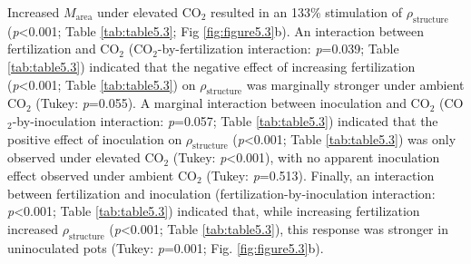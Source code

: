 Increased $M_\mathrm{area}$ under elevated CO$_2$ resulted in an 133\% stimulation of $\rho_\mathrm{structure}$ (\textit{p}<0.001; Table \ref{tab:table5.3}; Fig \ref{fig:figure5.3}b). An interaction between fertilization and CO$_2$ (CO$_2$-by-fertilization interaction: \textit{p}=0.039; Table \ref{tab:table5.3}) indicated that the negative effect of increasing fertilization (\textit{p}<0.001; Table \ref{tab:table5.3}) on $\rho_\mathrm{structure}$ was marginally stronger under ambient CO$_2$ (Tukey: \textit{p}=0.055). A marginal interaction between inoculation and CO$_2$ (CO$_2$-by-inoculation interaction: \textit{p}=0.057; Table \ref{tab:table5.3}) indicated that the positive effect of inoculation on $\rho_\mathrm{structure}$ (\textit{p}<0.001; Table \ref{tab:table5.3}) was only observed under elevated CO$_2$ (Tukey: \textit{p}<0.001), with no apparent inoculation effect observed under ambient CO$_2$ (Tukey: \textit{p}=0.513). Finally, an interaction between fertilization and inoculation (fertilization-by-inoculation interaction: \textit{p}<0.001; Table \ref{tab:table5.3}) indicated that, while increasing fertilization increased $\rho_\mathrm{structure}$ (\textit{p}<0.001; Table \ref{tab:table5.3}), this response was stronger in uninoculated pots (Tukey: \textit{p}=0.001; Fig. \ref{fig:figure5.3}b).

